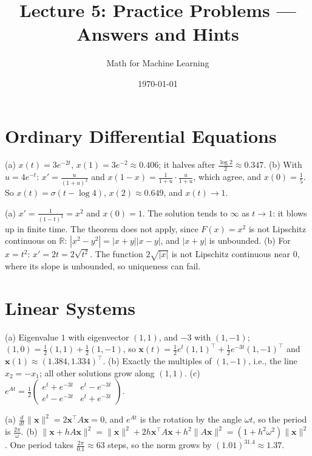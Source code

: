 \documentclass[11pt]{article}
\title{Lecture 5: Practice Problems --- Answers and Hints}
\author{Math for Machine Learning}
\date{\today}
\newcommand{\norm}[1]{\lVert #1 \rVert}
\begin{document}
\maketitle

\section*{Ordinary Differential Equations}

\begin{description}[leftmargin=0pt, itemsep=0.3em]
    \item[\ref{pr:scalar-ode}.] (a) $x(t) = 3e^{-2t}$, $x(1) = 3e^{-2} \approx 0.406$; it halves after $\frac{\log 2}{2} \approx 0.347$. (b) With $u = 4e^{-t}$: $x' = \frac{u}{(1 + u)^2}$ and $x(1 - x) = \frac{1}{1 + u}\cdot\frac{u}{1 + u}$, which agree, and $x(0) = \frac{1}{5}$. So $x(t) = \sigma(t - \log 4)$, $x(2) \approx 0.649$, and $x(t) \to 1$.
    \item[\ref{pr:existence}.] (a) $x' = \frac{1}{(1 - t)^2} = x^2$ and $x(0) = 1$. The solution tends to $\infty$ as $t \to 1$: it blows up in finite time. The theorem does not apply, since $F(x) = x^2$ is not Lipschitz continuous on $\mathbb{R}$: $|x^2 - y^2| = |x + y||x - y|$, and $|x + y|$ is unbounded. (b) For $x = t^2$: $x' = 2t = 2\sqrt{t^2}$. The function $2\sqrt{|x|}$ is not Lipschitz continuous near $0$, where its slope is unbounded, so uniqueness can fail.
\end{description}

\section*{Linear Systems}

\begin{description}[leftmargin=0pt, itemsep=0.3em]
    \item[\ref{pr:linear-system}.] (a) Eigenvalue $1$ with eigenvector $(1, 1)$, and $-3$ with $(1, -1)$; $(1, 0) = \frac{1}{2}(1, 1) + \frac{1}{2}(1, -1)$, so $\mathbf{x}(t) = \frac{1}{2}e^t(1, 1)^\top + \frac{1}{2}e^{-3t}(1, -1)^\top$ and $\mathbf{x}(1) \approx (1.384, 1.334)^\top$. (b) Exactly the multiples of $(1, -1)$, i.e., the line $x_2 = -x_1$; all other solutions grow along $(1, 1)$. (c) $e^{At} = \frac{1}{2}\begin{pmatrix} e^t + e^{-3t} & e^t - e^{-3t} \\ e^t - e^{-3t} & e^t + e^{-3t} \end{pmatrix}$.
    \item[\ref{pr:rotation-ode}.] (a) $\frac{d}{dt}\norm{\mathbf{x}}^2 = 2\mathbf{x}^\top A\mathbf{x} = 0$, and $e^{At}$ is the rotation by the angle $\omega t$, so the period is $\frac{2\pi}{\omega}$. (b) $\norm{\mathbf{x} + hA\mathbf{x}}^2 = \norm{\mathbf{x}}^2 + 2h\mathbf{x}^\top A\mathbf{x} + h^2\norm{A\mathbf{x}}^2 = (1 + h^2\omega^2)\norm{\mathbf{x}}^2$. One period takes $\frac{2\pi}{0.1} \approx 63$ steps, so the norm grows by $(1.01)^{31.4} \approx 1.37$.
\end{description}
\end{document}
